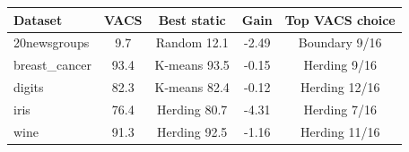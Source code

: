 \begin{tabular}{lcccc}
\toprule
Dataset & VACS & Best static & Gain & Top VACS choice \\
\midrule
20newsgroups & 9.7 & Random 12.1 & -2.49 & Boundary 9/16 \\
breast\_cancer & 93.4 & K-means 93.5 & -0.15 & Herding 9/16 \\
digits & 82.3 & K-means 82.4 & -0.12 & Herding 12/16 \\
iris & 76.4 & Herding 80.7 & -4.31 & Herding 7/16 \\
wine & 91.3 & Herding 92.5 & -1.16 & Herding 11/16 \\
\bottomrule
\end{tabular}
